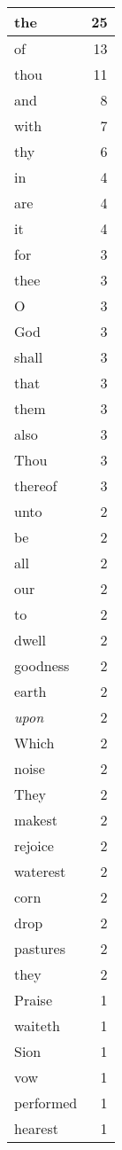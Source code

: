 \begin{center}
\begin{longtable}{l|r}
\hline \hline
\endlastfoot
the & 25 \\ \hline
of & 13 \\ \hline
thou & 11 \\ \hline
and & 8 \\ \hline
with & 7 \\ \hline
thy & 6 \\ \hline
in & 4 \\ \hline
are & 4 \\ \hline
it & 4 \\ \hline
for & 3 \\ \hline
thee & 3 \\ \hline
O & 3 \\ \hline
God & 3 \\ \hline
shall & 3 \\ \hline
that & 3 \\ \hline
them & 3 \\ \hline
also & 3 \\ \hline
Thou & 3 \\ \hline
thereof & 3 \\ \hline
unto & 2 \\ \hline
be & 2 \\ \hline
all & 2 \\ \hline
our & 2 \\ \hline
to & 2 \\ \hline
dwell & 2 \\ \hline
goodness & 2 \\ \hline
earth & 2 \\ \hline
\emph{upon} & 2 \\ \hline
Which & 2 \\ \hline
noise & 2 \\ \hline
They & 2 \\ \hline
makest & 2 \\ \hline
rejoice & 2 \\ \hline
waterest & 2 \\ \hline
corn & 2 \\ \hline
drop & 2 \\ \hline
pastures & 2 \\ \hline
they & 2 \\ \hline
Praise & 1 \\ \hline
waiteth & 1 \\ \hline
Sion & 1 \\ \hline
vow & 1 \\ \hline
performed & 1 \\ \hline
hearest & 1 \\ \hline

\end{longtable}
\end{center}
